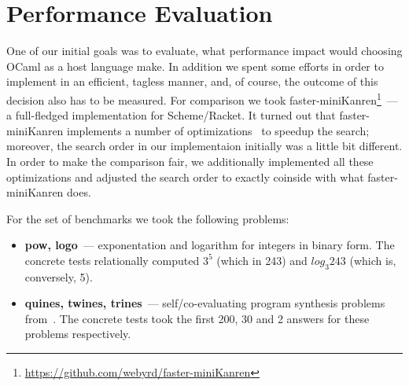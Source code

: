 
\section{Performance Evaluation}
\label{sec:evaluation}

One of our initial goals was to evaluate, what performance impact would choosing OCaml as a host language make. In addition we spent some 
efforts in order to implement \miniKanren in an efficient, tagless manner, and, of course, the outcome of this decision also has to be 
measured. For comparison we took faster-miniKanren\footnote{\url{https://github.com/webyrd/faster-miniKanren}}~--- a full-fledged 
\miniKanren implementation for Scheme/Racket. It turned out that faster-miniKanren implements a number of optimizations~\cite{WillThesis, Optimizations} 
to speedup the search; moreover, the search order in our implementaion initially was a little bit different. In order to make the comparison
fair, we additionally implemented all these optimizations and adjusted the search order to exactly coinside with 
what faster-miniKanren does.

For the set of benchmarks we took the following problems:

\begin{itemize}
\item \textbf{pow, logo}~--- exponentation and logarithm for integers in binary form. The concrete tests relationally computed
$3^5$ (which in 243) and $log_3 243$ (which is, conversely, 5).
\item \textbf{quines, twines, trines}~--- self/co-evaluating program synthesis problems from~\cite{Untagged}. The
concrete tests took the first 200, 30 and 2 answers for these problems respectively.
\end{itemize}


